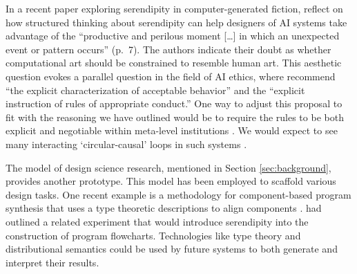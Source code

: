 In a recent paper exploring serendipity in computer-generated fiction,
\citet{mccallum2018} reflect on how structured thinking about
serendipity can help designers of AI systems take advantage of the
``productive and perilous moment [\ldots] in which an unexpected event
or pattern occurs'' (p.~7).  The authors indicate their doubt as
whether computational art should be constrained to resemble human art.
This aesthetic question evokes a parallel question in the field of AI ethics, where
\citet{caliskan2017semantics} recommend ``the explicit
characterization of acceptable behavior'' and the ``explicit
instruction of rules of appropriate conduct.''  One way to adjust this proposal to fit with the reasoning we have outlined would be to require the rules
to be both explicit and negotiable within meta-level institutions
\cite{corneli2016institutional}.  We would expect to see many interacting `circular-causal' loops in such systems \cite{loughran2018serendipity}.

The model of design science research, mentioned in
Section \ref{sec:background}, provides another prototype.  This model has been employed to scaffold various
design tasks.  One recent example is a methodology for component-based
program synthesis that uses a type theoretic descriptions to align
components \cite{10.1007/978-3-030-03427-6_35}.
\citet{pease2013discussion} had outlined a related experiment that
would introduce serendipity into the construction of program
flowcharts.  Technologies like type theory and
distributional semantics \cite{DBLP:journals/corr/abs-1803-09473}
could be used by future systems to both generate and interpret their
results.

